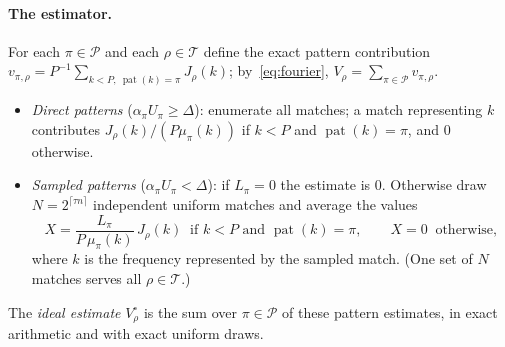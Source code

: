\documentclass[11pt]{article}
\theoremstyle{definition}
\newcommand{\ceil}[1]{\lceil #1\rceil}
\newcommand{\cP}{\mathcal P}
\newcommand{\cT}{\mathcal T}
\newcommand{\pat}{\operatorname{pat}}
\begin{document}
\paragraph{The estimator.} For each $\pi\in\cP$ and each $\rho\in\cT$ define the exact pattern contribution
$v_{\pi,\rho}=P^{-1}\sum_{k<P,\ \pat(k)=\pi}J_\rho(k)$; by~\eqref{eq:fourier}, $V_\rho=\sum_{\pi\in\cP}v_{\pi,\rho}$.
\begin{itemize}
\item \emph{Direct patterns} ($\alpha_\pi U_\pi\ge\Delta$): enumerate all matches; a match representing $k$
contributes $J_\rho(k)/(P\mu_\pi(k))$ if $k<P$ and $\pat(k)=\pi$, and $0$ otherwise.
\item \emph{Sampled patterns} ($\alpha_\pi U_\pi<\Delta$): if $L_\pi=0$ the estimate is $0$. Otherwise draw
$N=2^{\ceil{\tau n}}$ independent uniform matches and average the values
\begin{equation}\label{eq:X}
 X=\frac{L_\pi}{P\,\mu_\pi(k)}\,J_\rho(k)\ \text{ if }k<P\text{ and }\pat(k)=\pi,\qquad X=0\ \text{ otherwise},
\end{equation}
where $k$ is the frequency represented by the sampled match. (One set of $N$ matches serves all $\rho\in\cT$.)
\end{itemize}
The \emph{ideal estimate} $V^\circ_\rho$ is the sum over $\pi\in\cP$ of these pattern estimates, in exact arithmetic
and with exact uniform draws.
\end{document}
